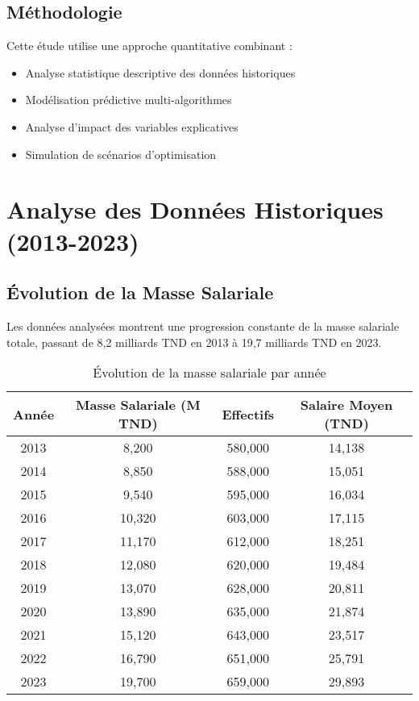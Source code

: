 \documentclass[12pt,a4paper]{article}
\begin{document}
\subsection{Méthodologie}
Cette étude utilise une approche quantitative combinant :
\begin{itemize}
    \item Analyse statistique descriptive des données historiques
    \item Modélisation prédictive multi-algorithmes
    \item Analyse d'impact des variables explicatives
    \item Simulation de scénarios d'optimisation
\end{itemize}

\newpage

\section{Analyse des Données Historiques (2013-2023)}

\subsection{Évolution de la Masse Salariale}
Les données analysées montrent une progression constante de la masse salariale totale, passant de 8,2 milliards TND en 2013 à 19,7 milliards TND en 2023.

\begin{table}[H]
\centering
\caption{Évolution de la masse salariale par année}
\begin{tabular}{@{}cccc@{}}
\toprule
\textbf{Année} & \textbf{Masse Salariale (M TND)} & \textbf{Effectifs} & \textbf{Salaire Moyen (TND)} \\
\midrule
2013 & 8,200 & 580,000 & 14,138 \\
2014 & 8,850 & 588,000 & 15,051 \\
2015 & 9,540 & 595,000 & 16,034 \\
2016 & 10,320 & 603,000 & 17,115 \\
2017 & 11,170 & 612,000 & 18,251 \\
2018 & 12,080 & 620,000 & 19,484 \\
2019 & 13,070 & 628,000 & 20,811 \\
2020 & 13,890 & 635,000 & 21,874 \\
2021 & 15,120 & 643,000 & 23,517 \\
2022 & 16,790 & 651,000 & 25,791 \\
2023 & 19,700 & 659,000 & 29,893 \\
\bottomrule
\end{tabular}
\end{table}
\end{document}
